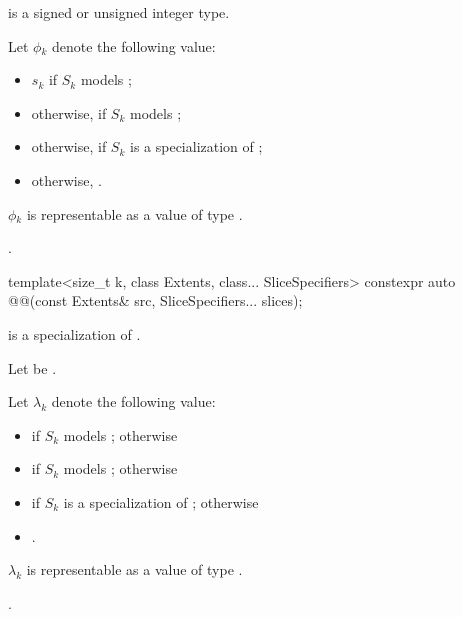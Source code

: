 \begin{itemdescr}
\pnum
\mandates
{} is a signed or unsigned integer type.

\pnum
Let $\phi{}_k$ denote the following value:
\begin{itemize}
\item
$s_k$ if $S_k$ models ;
\item
otherwise,
if $S_k$ models ;
\item
otherwise,
if $S_k$ is a specialization of ;
\item
otherwise,
.
\end{itemize}

\pnum
\expects
$\phi{}_k$ is representable as a value of type .

\pnum
\returns
{}.
\end{itemdescr}

%
\begin{itemdecl}
template<size_t k, class Extents, class... SliceSpecifiers>
  constexpr auto @@(const Extents& src, SliceSpecifiers... slices);
\end{itemdecl}

\begin{itemdescr}
\pnum
\mandates
{} is a specialization of .

\pnum
Let  be .

\pnum
Let $\lambda{}_k$ denote the following value:
\begin{itemize}
\item
{}
if $S_k$ models ; otherwise
\item
{}
if $S_k$ models ; otherwise
\item
{} \tcode{+}
if $S_k$ is a specialization of ; otherwise
\item
.
\end{itemize}

\pnum
\expects
$\lambda{}_k$ is representable as a value of type .

\pnum
\returns
{}.
\end{itemdescr}

